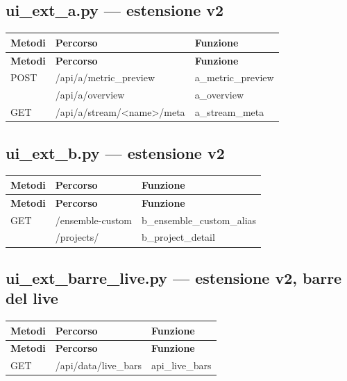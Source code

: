 \subsection{ui\_ext\_a.py --- estensione v2}
\begin{longtable}{@{}L{17mm}L{74mm}L{45mm}@{}}
\toprule
\textbf{Metodi} & \textbf{Percorso} & \textbf{Funzione} \\
\midrule\endfirsthead
\toprule
\textbf{Metodi} & \textbf{Percorso} & \textbf{Funzione} \\
\midrule\endhead
{\scriptsize\sffamily POST} & {\ttfamily\scriptsize /\allowbreak api/\allowbreak a/\allowbreak metric\_\allowbreak{}preview} & {\ttfamily\scriptsize a\_\allowbreak{}metric\_\allowbreak{}preview} \\
 & {\ttfamily\scriptsize /\allowbreak api/\allowbreak a/\allowbreak overview} & {\ttfamily\scriptsize a\_\allowbreak{}overview} \\
{\scriptsize\sffamily GET} & {\ttfamily\scriptsize /\allowbreak api/\allowbreak a/\allowbreak stream/\allowbreak <name>/\allowbreak meta} & {\ttfamily\scriptsize a\_\allowbreak{}stream\_\allowbreak{}meta} \\
\bottomrule
\end{longtable}

\subsection{ui\_ext\_b.py --- estensione v2}
\begin{longtable}{@{}L{17mm}L{74mm}L{45mm}@{}}
\toprule
\textbf{Metodi} & \textbf{Percorso} & \textbf{Funzione} \\
\midrule\endfirsthead
\toprule
\textbf{Metodi} & \textbf{Percorso} & \textbf{Funzione} \\
\midrule\endhead
{\scriptsize\sffamily GET} & {\ttfamily\scriptsize /\allowbreak ensemble-custom} & {\ttfamily\scriptsize b\_\allowbreak{}ensemble\_\allowbreak{}custom\_\allowbreak{}alias} \\
 & {\ttfamily\scriptsize /\allowbreak projects/} & {\ttfamily\scriptsize b\_\allowbreak{}project\_\allowbreak{}detail} \\
\bottomrule
\end{longtable}

\subsection{ui\_ext\_barre\_live.py --- estensione v2, barre del live}
\begin{longtable}{@{}L{17mm}L{74mm}L{45mm}@{}}
\toprule
\textbf{Metodi} & \textbf{Percorso} & \textbf{Funzione} \\
\midrule\endfirsthead
\toprule
\textbf{Metodi} & \textbf{Percorso} & \textbf{Funzione} \\
\midrule\endhead
{\scriptsize\sffamily GET} & {\ttfamily\scriptsize /\allowbreak api/\allowbreak data/\allowbreak live\_\allowbreak{}bars} & {\ttfamily\scriptsize api\_\allowbreak{}live\_\allowbreak{}bars} \\
\bottomrule
\end{longtable}


